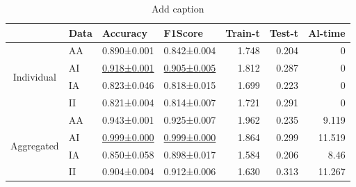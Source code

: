 \documentclass[journal]{IEEEtran}
\begin{document}
\begin{table}[htbp]
	\centering
	\caption{Add caption}
	\begin{tabular}{@{}clllrrr@{}}
		\toprule
		& Data  & Accuracy & F1Score & \multicolumn{1}{l}{Train-t} & \multicolumn{1}{l}{Test-t} & \multicolumn{1}{l}{Al-time} \\
		\midrule
		\multirow{4}[2]{*}{\begin{sideways}Individual\end{sideways}} & AA    & 0.890±0.001 & 0.842±0.004 & 1.748 & 0.204 & 0 \\
		& AI    & \underline{0.918±0.001}  & \underline{0.905±0.005} & 1.812 & 0.287 & 0 \\
		& IA    & 0.823±0.046 & 0.818±0.015 & 1.699 & 0.223 & 0 \\
		& II    & 0.821±0.004 & 0.814±0.007 & 1.721 & 0.291 & 0 \\
		\midrule
		\multirow{4}[2]{*}{\begin{sideways}Aggregated\end{sideways}} & AA    & 0.943±0.001 & 0.925±0.007 & 1.962 & 0.235 & 9.119 \\
		& AI    & \underline{0.999±0.000} & \underline{0.999±0.000} & 1.864 & 0.299 & 11.519 \\
		& IA    & 0.850±0.058 & 0.898±0.017 & 1.584 & 0.206 & 8.46 \\
		& II    & 0.904±0.004 & 0.912±0.006 & 1.630  & 0.313 & 11.267 \\
		\bottomrule
	\end{tabular}%
	\label{tab:result}%
\end{table}%
\end{document}
